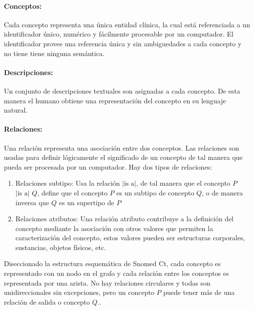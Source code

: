 \paragraph{Conceptos:}
Cada concepto representa una única entidad clínica, la cual está referenciada a un identificador único, numérico y fácilmente procesable por un computador. El identificador provee una referencia única y sin ambiguedades a cada concepto y no tiene tiene ninguna semántica.\cite{ihtsdo2016SG}

\paragraph{Descripciones:}
Un conjunto de descripciones textuales son asignadas a cada concepto. De esta manera el humano obtiene una representación del concepto en su lenguaje natural.

\paragraph{Relaciones:}
Una relación representa una asociación entre dos conceptos. Las relaciones son usadas para definir lógicamente el significado de un concepto de tal manera que pueda ser procesada por un computador. Hay dos tipos de relaciones:

\begin{enumerate}
\item Relaciones subtipo: Usa la relación $|\text{is a}|$, de tal manera que el concepto $P$ $|\text{is a}|$ $Q$,  define que el concepto $P$ es un subtipo de concepto $Q$, o de manera inversa que $Q$ es un supertipo de $P$
\item Relaciones atributos: Una relación atributo contribuye a la definición del concepto mediante la asociación con otros valores que permiten la caracterización del concepto, estos valores pueden ser estructuras corporales, sustancias, objetos físicos, etc.
\end{enumerate}

Diseccionado la estructura esquemática de Snomed Ct, cada concepto es representado con un nodo en el grafo y cada relación entre los conceptos es representada por una arista. No hay relaciones circulares y todas son unidireccionales sin excepciones, pero un concepto $P$ puede tener más de una relación de salida o concepto $Q$.\cite{Bhattacharyya2016}.


